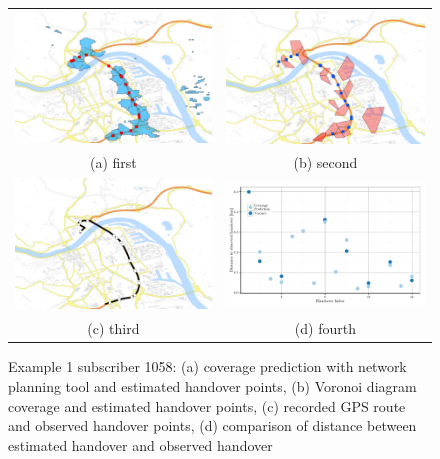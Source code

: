 \begin{figure}
\begin{tabular}{cc}
  \includegraphics[width=65mm]{./images/1058_Coverage_Handover} 
  &   \includegraphics[width=65mm]{./images/1058_Voronoi_Handover} \\
(a) first & (b) second \\[6pt]
 \includegraphics[width=65mm]{./images/1058_Handover} 
 &   \includegraphics[width=65mm]{./images/1058_predvorcomp} \\
(c) third & (d) fourth \\[6pt]
\end{tabular}
\caption{Example 1 subscriber 1058: (a) coverage prediction with network planning tool and estimated handover points, (b) Voronoi diagram coverage and estimated handover points, (c) recorded GPS route and observed handover points, (d) comparison of distance between estimated handover and observed handover}
\label{fig:tettaroutes}
\end{figure}

